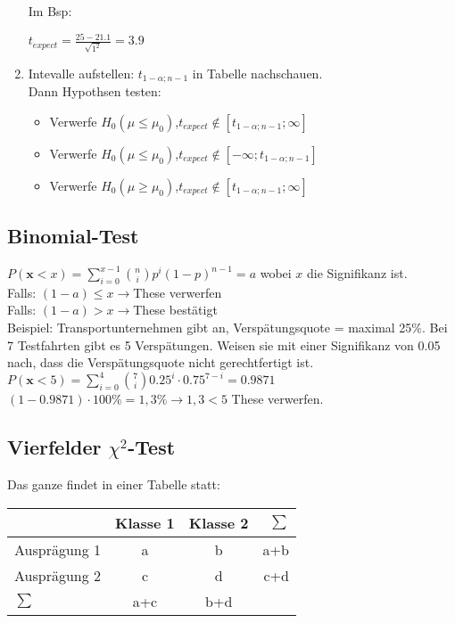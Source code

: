 \documentclass[a4paper, 11pt]{article}
\begin{document}
\begin{enumerate}
     Im Bsp:

     $ t_{expect} = \frac{ 25 - 21.1} { \sqrt{1^2}} = 3.9$
   \item Intevalle aufstellen:
     $t_{1-\alpha; n-1}$ in Tabelle nachschauen.\\

     Dann Hypothsen testen:\\

     \begin {itemize}
       \item Verwerfe $ H_0(\mu \leq \mu_0)$,$ t_{expect} \notin [t_{1-\alpha; n-1}; \infty]$ 
       \item Verwerfe $ H_0(\mu \leq \mu_0)$,$ t_{expect} \notin [- \infty; t_{1-\alpha; n-1}]$ 
       \item Verwerfe $ H_0(\mu \geq \mu_0)$,$ t_{expect} \notin [t_{1-\alpha; n-1}; \infty]$ 
     \end{itemize}

\end{enumerate}
\subsection{Binomial-Test}
$P(\textbf{x} < x)=\sum\limits_{i=0}^{x-1}{n \choose{i}}p^{i}(1-p)^{n-1} = a$
wobei $x$ die Signifikanz ist. \\
Falls: $(1-a) \le x \rightarrow $These verwerfen\\
Falls: $(1-a) > x \rightarrow $These bestätigt\\
\newline
Beispiel: Transportunternehmen gibt an, Verspätungsquote = maximal 25\%. Bei 7
Testfahrten gibt es 5 Verspätungen. Weisen sie mit einer Signifikanz von 0.05
nach, dass die Verspätungsquote nicht gerechtfertigt ist. \\
$P(\textbf{x} < 5) = \sum\limits_{i=0}^{4}{7 \choose{i}}0.25^{i}\cdot
0.75^{7-i} = 0.9871	$\\
$(1-0.9871)\cdot 100\% = 1,3\% \rightarrow 1,3 < 5$ These verwerfen.\\
\subsection{Vierfelder $\chi^2$-Test}
Das ganze findet in einer Tabelle statt: \\

\begin{tabular}{l | c | c | r}
	 & Klasse 1 & Klasse 2 & $\sum$\\ \hline
	Ausprägung 1 & a & b & a+b\\
	Ausprägung 2 & c & d & c+d\\ \hline
	$\sum$ & a+c & b+d\\ 
\end{tabular}
\end{document}
